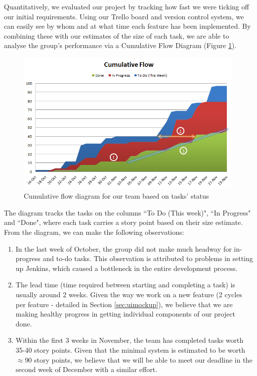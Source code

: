 \documentclass[a4paper, titlepage]{article}
\begin{document}
Quantitatively, we evaluated our project by tracking how fast we were ticking off our initial requirements. Using our Trello board and version control system, we can easily see by whom and at what time each feature has been implemented. By combining these with our estimates of the size of each task, we are able to analyse the group's performance via a Cumulative Flow Diagram (Figure \ref{fig:eval_cumuflow}).

\begin{figure}[ht]
  \centering
    \includegraphics[width = 0.99\textwidth]{./eval/cumu_flow.png}
  \caption{Cumulative flow diagram for our team based on tasks' status}
  \label{fig:eval_cumuflow}
\end{figure}

The diagram tracks the tasks on the columns ``To Do (This week)", ``In Progress" and ``Done", where each task carries a story point based on their size estimate. From the diagram, we can make the following observations:

\begin{enumerate}

  \item In the last week of October, the group did not make much headway for in-progress and to-do tasks. This observation is attributed to problems in setting up Jenkins, which caused a bottleneck in the entire development process.

  \item The lead time (time required between starting and completing a task) is usually around 2 weeks. Given the way we work on a new feature (2 cycles per feature - detailed in Section \ref{sec:uimockup}), we believe that we are making healthy progress in getting individual components of our project done.

  \item Within the first 3 weeks in November, the team has completed tasks worth 35-40 story points. Given that the minimal system is estimated to be worth $\approx$90 story points, we believe that we will be able to meet our deadline in the second week of December with a similar effort.

\end{enumerate}
\end{document}
